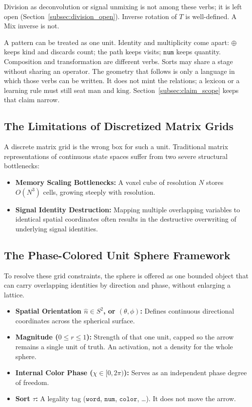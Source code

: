 \documentclass[12pt, a4paper]{article}
\begin{document}
Division as deconvolution or signal unmixing is not among these
verbs; it is left open
(Section~\ref{subsec:division_open}).
Inverse rotation of $T$ is well-defined. A Mix inverse is not.

A pattern can be treated as one unit. Identity and multiplicity come
apart: $\oplus$ keeps kind and discards count; the path keeps visits;
$\mathtt{num}$ keeps quantity. Composition and transformation are
different verbs. Sorts may share a stage without sharing an operator.
The geometry that follows is only a language in which those verbs can
be written. It does not mint the relations; a lexicon or a learning
rule must still seat $\mathrm{man}$ and $\mathrm{king}$.
Section~\ref{subsec:claim_scope} keeps that claim narrow.

\subsection{The Limitations of Discretized Matrix Grids}
A discrete matrix grid is the wrong box for such a unit. Traditional matrix representations of continuous state spaces suffer from two severe structural bottlenecks:
\begin{itemize}
    \item \textbf{Memory Scaling Bottlenecks:} A voxel cube of resolution $N$ stores $O(N^3)$ cells, growing steeply with resolution.
    \item \textbf{Signal Identity Destruction:} Mapping multiple overlapping variables to identical spatial coordinates often results in the destructive overwriting of underlying signal identities.
\end{itemize}

\subsection{The Phase-Colored Unit Sphere Framework}
To resolve these grid constraints, the sphere is offered as one bounded object that can carry overlapping identities by direction and phase, without enlarging a lattice.
\begin{itemize}
    \item \textbf{Spatial Orientation $\hat n \in S^2$, or $(\theta, \phi)$:} Defines continuous directional coordinates across the spherical surface.
    \item \textbf{Magnitude ($0 \leq r \leq 1$):} Strength of that one unit, capped so the arrow remains a single unit of truth. An activation, not a density for the whole sphere.
    \item \textbf{Internal Color Phase ($\chi \in [0, 2\pi)$):} Serves as an independent phase degree of freedom.
    \item \textbf{Sort $\tau$:} A legality tag ($\mathtt{word}$, $\mathtt{num}$, $\mathtt{color}$, \ldots). It does not move the arrow.
\end{itemize}
\end{document}
